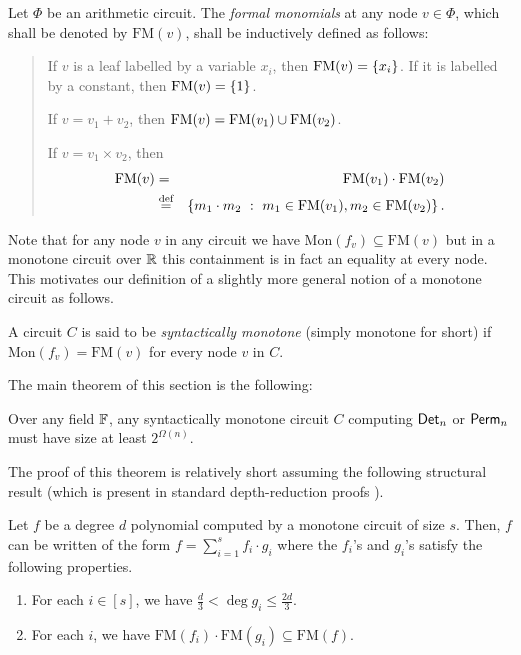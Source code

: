 \documentclass[12pt]{report}
\newcommand{\FM}{\mathrm{FM}}
\newcommand{\Mon}{\mathrm{Mon}}
\begin{document}
	\begin{definition}
  Let $\Phi$ be an arithmetic circuit. The \emph{formal monomials} at
  any node $v\in \Phi$, which shall be denoted by $\FM(v)$, shall 
  be inductively defined as follows:
	  \begin{quote}
	    If $v$ is a leaf labelled by a variable $x_i$, then $\FM(v) =
	    \inbrace{x_i}$. If it is labelled by a constant, then $\FM(v) =
	    \inbrace{1}$.
	    
	    If $v = v_1 + v_2$, then $\FM(v) = \FM(v_1) \union \FM(v_2)$. 
	
	    If $v = v_1 \times v_2$, then 
            \begin{eqnarray*}
              \FM(v) &=& \FM(v_1)\cdot \FM(v_2)\\
              &\eqdef& \setdef{m_1\cdot m_2}{m_1 \in \FM(v_1), m_2\in \FM(v_2)}.
            \end{eqnarray*}
          \end{quote}
	\end{definition}
	
\noindent Note that for any node $v$ in any circuit 
	we have $\Mon(f_{v}) \subseteq \FM(v)$ but in a 
	monotone circuit over $\mathbb{R}$ this containment is in 
	fact an equality at every node. This motivates our 
	definition of a slightly more general notion of a 
	monotone circuit as follows. 

	
\begin{definition}
  A circuit $C$ is said to be
  \emph{syntactically monotone}
   (simply monotone for short) if $\Mon(f_{v}) = \FM(v)$ 
   for every node $v$ in $C$.
\end{definition}
	
	
	
The main theorem of this section is the following: 

\begin{theorem}[\cite{js82}]\label{thm:monotone-circuit-lbs}
	Over any field $\mathbb{F}$, any syntactically monotone circuit 
	$C$ computing $\mathsf{Det}_n$ or $\mathsf{Perm}_n$ must have
  size at least $2^{\Omega(n)}$.
\end{theorem}

The proof of this theorem is relatively short assuming the
	following structural result (which is present in standard
	depth-reduction proofs \cite{vsbr83,ajmv98}).

\begin{lemma}\label{lem:vsbr-two-thirds}
  Let $f$ be a degree $d$ polynomial computed by a monotone circuit of
  size $s$. Then, $f$ can be written of the form $f = \sum_{i=1}^s f_i
  \cdot g_i$ where the $f_i$'s and $g_i$'s satisfy the following
  properties.
\begin{enumerate}
\item For each $i\in [s]$, we have $\frac{d}{3} < \deg{g_i} \leq
  \frac{2d}{3}$.
\item For each $i$, we have $\FM(f_i)\cdot \FM(g_i) \subseteq \FM(f)$.
\end{enumerate}
\end{lemma}
\end{document}
